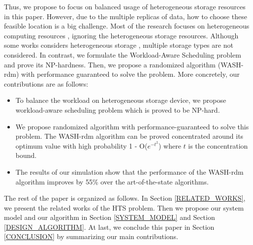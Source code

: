 \documentclass[conference]{IEEEtran}
\begin{document}
Thus, we propose to focus on balanced usage of heterogeneous storage resources in this paper. However, due to the multiple replicas of data, how to choose these feasible location is a big challenge.
 Most of the research focuses on heterogeneous computing resources \cite{b25}\cite{b26}\cite{b35}\cite{b36}, ignoring the heterogeneous storage resources. Although some works considers heterogeneous storage \cite{b6}\cite{b7}, multiple storage types are not considered. In contrast, we formulate the Workload-Aware Scheduling problem and prove its NP-hardness. Then, we propose a randomized algorithm (WASH-rdm) with performance guaranteed to solve the problem.
More concretely, our contributions are as follows: 

\begin{itemize}
\item To balance the workload on heterogeneous storage device, we propose workload-aware scheduling problem which is proved to be NP-hard. 
\item We propose randomized algorithm with performance-guaranteed to solve this problem. The WASH-rdm algorithm can be proved concentrated around its optimum value with high probability 1 - O($e^{-t^2}$) where $t$ is the concentration bound.
\item The results of our simulation show that the performance of the WASH-rdm algorithm improves by 55\% over the art-of-the-state algorithms.
\end{itemize}

The rest of the paper is organized as follows. In Section \ref{RELATED_WORKS}, we present the related works of the HTS problem. Then we propose our system model and our algorithm in Section  \ref{SYSTEM_MODEL} and Section  \ref{DESIGN_ALGORITHM}. At last, we conclude this paper in Section \ref{CONCLUSION} by summarizing our main contributions.
\end{document}
